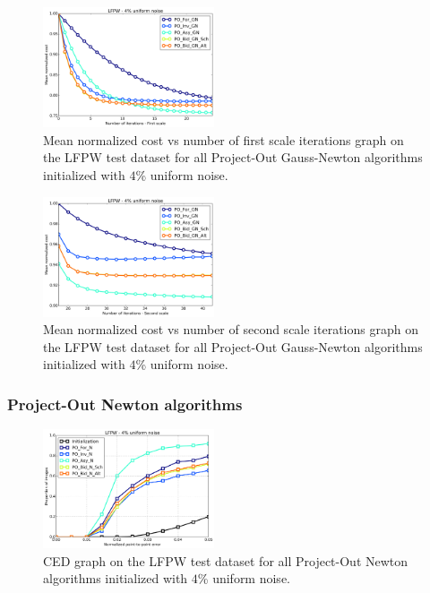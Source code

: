 \begin{figure}[h!]
    \centering
    \includegraphics[width=0.45\textwidth]{experiments/algorithms/po_gn/mean_cost_vs_iters1_po_gn_4.png}
    \caption{Mean normalized cost vs number of first scale iterations graph on the LFPW test dataset for all Project-Out Gauss-Newton algorithms initialized with $4$\% uniform noise.}
    \label{fig:mean_cost_vs_iters1_po_gn_4}
\end{figure}

\begin{figure}[h!]
    \centering
    \includegraphics[width=0.45\textwidth]{experiments/algorithms/po_gn/mean_cost_vs_iters2_po_gn_4.png}
    \caption{Mean normalized cost vs number of second scale iterations graph on the LFPW test dataset for all Project-Out Gauss-Newton algorithms initialized with $4$\% uniform noise.}
    \label{fig:mean_cost_vs_iters2_po_gn_4}
\end{figure}


\subsubsection{Project-Out Newton algorithms}

\begin{figure}[h!]
    \centering
    \includegraphics[width=0.45\textwidth]{experiments/algorithms/po_n/ced_po_n_4.png}
    \caption{CED graph on the LFPW test dataset for all Project-Out Newton algorithms initialized with $4$\% uniform noise.}
    \label{fig:ced_po_gn_4}
\end{figure}

